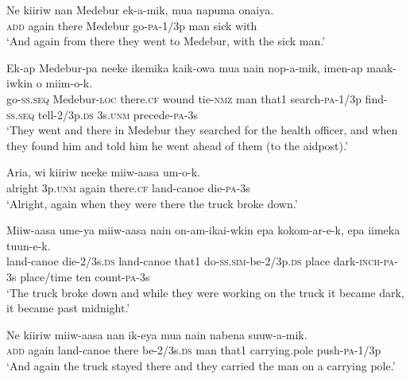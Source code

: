 \ea\label{ex:a:x28}
\gll  Ne  kiiriw  nan  Medebur  ek-a-mik,  mua  napuma  onaiya. \\
\textsc{add}  again  there  Medebur  go-\textsc{pa}-1/3p  man  sick  with \\
\glt ‘And again from there they went to Medebur, with the sick man.’ \\
\z


\ea\label{ex:a:x29}
\gll  Ek-ap  Medebur-pa  neeke  ikemika  kaik-owa  mua  nain  nop-a-mik,  imen-ap  maak-iwkin  o  miim-o-k. \\
go-\textsc{ss.seq}  Medebur-\textsc{loc}  there.\textsc{cf}  wound  tie-\textsc{nmz}  man  that1  search-\textsc{pa}-1/3p  find-\textsc{ss.seq}  tell-2/3p.\textsc{ds}  3s.\textsc{unm}  precede-\textsc{pa}-3s \\


\glt ‘They went and there in Medebur they searched for the health officer, and when they found him and told him he went ahead of them (to the aidpost).’ \\
\z


\ea\label{ex:a:x30}
\gll  Aria,  wi  kiiriw  neeke  miiw-aasa  um-o-k. \\
alright  3p.\textsc{unm}  again  there.\textsc{cf}  land-canoe  die-\textsc{pa}-3s \\
\glt ‘Alright, again when they were there the truck broke down.’ \\
\z


\ea\label{ex:a:x31}
\gll  Miiw-aasa  ume-ya  miiw-aasa  nain  on-am-ikai-wkin         epa  kokom-ar-e-k,  epa  iimeka  tuun-e-k. \\
land-canoe  die-2/3s.\textsc{ds}  land-canoe  that1  do-\textsc{ss}.\textsc{sim}-be-2/3p.\textsc{ds}  place  dark-\textsc{inch}-\textsc{pa}-3s  place/time  ten  count-\textsc{pa}-3s \\


\glt ‘The truck broke down and while they were working on the truck it became dark, it became past midnight.’ \\
\z


\ea\label{ex:a:x32}
\gll  Ne  kiiriw  miiw-aasa  nan  ik-eya  mua  nain  nabena          suuw-a-mik. \\
\textsc{add}  again  land-canoe  there  be-2/3s.\textsc{ds}  man  that1  carrying.pole push-\textsc{pa}-1/3p \\


\glt ‘And again the truck stayed there and they carried the man on a carrying pole.’ \\
\z


